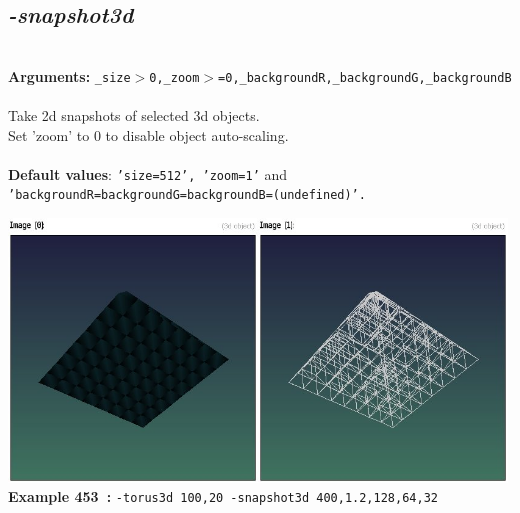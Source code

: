 \documentclass[a4paper,11pt,twoside]{book}
\begin{document}
\subsection{\emph{-snapshot3d} }\vspace*{-0.5em}
~\\\textbf{Arguments: } 
{\small \texttt{\_size$>$0,\_zoom$>$=0,\_backgroundR,\_backgroundG,\_backgroundB}}\\~\\
Take 2d snapshots of selected 3d objects.
~\\Set 'zoom' to 0 to disable object auto-scaling.
~\\~\\\textbf{Default values}: {\small \texttt{'size=512', 'zoom=1'} and \texttt{'backgroundR=backgroundG=backgroundB=(undefined)'.}}
\begin{center}\includegraphics[keepaspectratio=true,height=7cm,width=\textwidth]{img/gmic_def453.jpg}\\
{\footnotesize \textbf{Example 453~:} \texttt{-torus3d 100,20 -snapshot3d 400,1.2,128,64,32}}
\end{center}
\end{document}
